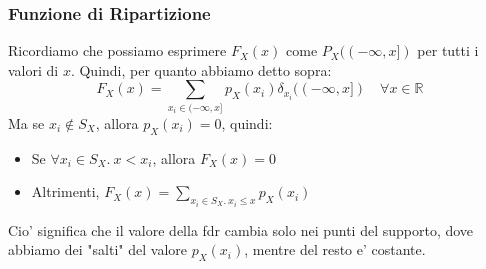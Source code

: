 \subsubsection{Funzione di Ripartizione}
Ricordiamo che possiamo esprimere $ F_X(x) $ come $ P_X((-\infty, x]) $ per tutti i valori di $ x $. Quindi, per quanto abbiamo detto sopra:
\[
  F_X(x) = \sum_{x_i \in (-\infty, x]} p_X(x_i)\delta_{x_i}((-\infty, x]) \quad \forall x \in \mathbb{R}
\]
Ma se $ x_i \notin S_X $, allora $ p_X(x_i) = 0 $, quindi:
\begin{itemize}
  \item Se $ \forall x_i \in S_X.\ x < x_i $, allora $ F_X(x) = 0 $
  \item Altrimenti, $ F_X(x) = \sum_{x_i \in S_X.\ x_i \leq x} p_X(x_i) $
\end{itemize}
Cio' significa che il valore della fdr cambia solo nei punti del supporto, dove abbiamo dei "salti" del valore $ p_X(x_i) $, mentre del resto e' costante.

